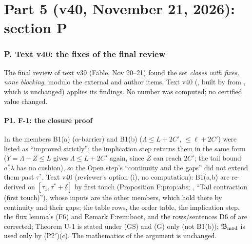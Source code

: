 \part*{Part 5 (v40, November 21, 2026): section P}
\section*{P. Text v40: the fixes of the final review }
The final review of text v39 (Fable, Nov 20--21) found the set \emph{closes with fixes, none blocking}, modulo the external and author items. Text v40 (, built by  from , which is unchanged) applies its findings. No number was computed; no certified value changed.
\subsection*{P1. F-1: the closure proof}
In  the members B1(a) ($\alpha$-barrier) and B1(b) ($\Lambda\le L+2C'$, $\le\ell+2C'$) were listed as ``improved strictly''; the implication step returns them in the same form ($Y=\Lambda-Z\le L$ gives $\Lambda\le L+2C'$ again, since $Z$ can reach $2C'$; the tail bound $a^*\lambda$ has no cushion), so the Open step's ``continuity and the gaps'' did not extend them past $\tau^*$. Text v40 (reviewer's option (i), no computation): B1(a,b) are re-derived on $[\tau_1,\tau^*+\delta]$ by first touch (Proposition F:prop:abs; , ``Tail contraction (first touch)''), whose inputs are the other members, which hold there by continuity and their gaps; the table rows, the order table, the implication step, the flux lemma's (F6) and Remark F:rem:boot, and the rows/sentences D6 of  are corrected; Theorem U-1 is stated under (GS) and (G) only (not B1(b)); $\mathfrak B_{\rm mod}$ is used only by (P2$'$)(c). The mathematics of the argument is unchanged.
